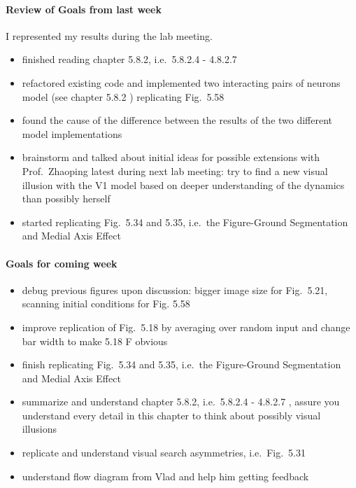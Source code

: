 \paragraph{Review of Goals from last week}
I represented my results during the lab meeting.
\begin{itemize}
	\item finished reading chapter 5.8.2, i.e.\ 5.8.2.4 - 4.8.2.7 \cite{zhaoping_understanding_2014}
	\item refactored existing code and implemented two interacting pairs of neurons model (see chapter 5.8.2 \cite{zhaoping_understanding_2014}) replicating Fig.\ 5.58 \cite{zhaoping_understanding_2014} 
	\item found the cause of the difference between the results of the two different model implementations
	\item brainstorm and talked about initial ideas for possible extensions with Prof.\ Zhaoping latest during next lab meeting: try to find a new visual illusion with the V1 model based on deeper understanding of the dynamics than possibly herself
	\item started replicating Fig.\ 5.34 and 5.35, i.e.\ the Figure-Ground Segmentation and Medial Axis Effect \cite{zhaoping_understanding_2014}
\end{itemize}

\paragraph{Goals for coming week}
\begin{itemize}
	\item debug previous figures upon discussion: bigger image size for Fig.\ 5.21, scanning initial conditions for Fig. 5.58 \cite{zhaoping_understanding_2014}
	\item improve replication of Fig.\ 5.18 by averaging over random input and change bar width to make 5.18 F obvious \cite{zhaoping_understanding_2014} 
	\item finish replicating  Fig.\ 5.34 and 5.35, i.e.\ the Figure-Ground Segmentation and Medial Axis Effect \cite{zhaoping_understanding_2014}
	\item summarize and understand chapter 5.8.2, i.e.\ 5.8.2.4 - 4.8.2.7 \cite{zhaoping_understanding_2014}, assure you understand every detail in this chapter to think about possibly visual illusions
	\item replicate and understand visual search asymmetries, i.e.\ Fig.\ 5.31 \cite{zhaoping_understanding_2014}
	\item understand flow diagram from Vlad and help him getting feedback
\end{itemize}

